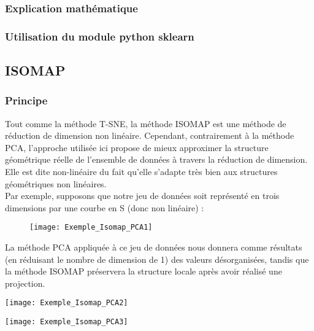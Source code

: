 \documentclass[12pt]{report}
\begin{document}
\subsubsection{Explication mathématique}

\subsubsection{Utilisation du module python sklearn}

\subsection{ISOMAP}

\subsubsection{Principe}

\noindent Tout comme la méthode T-SNE, la méthode ISOMAP est une méthode de réduction de dimension non linéaire. Cependant, contrairement à la méthode PCA, l'approche utilisée ici propose de mieux approximer la structure géométrique réelle de l'ensemble de données à travers la réduction de dimension. Elle est dite non-linéaire du fait qu'elle s'adapte très bien aux structures géométriques non linéaires.\\

\noindent Par exemple, supposons que notre jeu de données soit représenté en trois dimensions par une courbe en S (donc non linéaire) : \\

\begin{figure}[H] 
\centerline{\texttt{[image: Exemple\_Isomap\_PCA1]}}
\end{figure}

\noindent La méthode PCA appliquée à ce jeu de données nous donnera comme résultats (en réduisant le nombre de dimension de 1) des valeurs désorganisées, tandis que la méthode ISOMAP préservera la structure locale après avoir réalisé une projection.\\

\begin{minipage}[c]{.46\linewidth}
     \begin{center}
             \texttt{[image: Exemple\_Isomap\_PCA2]}
         \end{center}
   \end{minipage} \hfill
   \begin{minipage}[c]{.46\linewidth}
    \begin{center}
            \texttt{[image: Exemple\_Isomap\_PCA3]}
        \end{center}
 \end{minipage}
 
\end{document}
